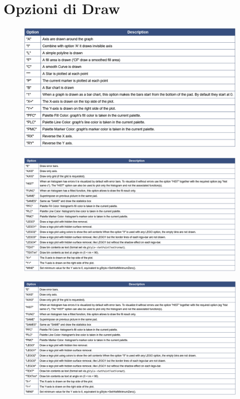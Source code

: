\documentclass[10pt,a4paper]{article}
\begin{document}
\section{Opzioni di Draw}\label{sec:Draw}
\begin{figure}[h!]
	\centering
	\includegraphics[width=0.7\linewidth]{"Screenshot 2022-06-04 221503"}
\end{figure}
\FloatBarrier
\begin{figure}[h!]
	\centering
	\includegraphics[width=0.7\linewidth]{"Screenshot 2022-06-04 222020"}
\end{figure}
\FloatBarrier
\begin{figure}[h!]
	\centering
	\includegraphics[width=0.7\linewidth]{"Screenshot 2022-06-04 222115"}
\end{figure}
\FloatBarrier
\newpage
\end{document}

